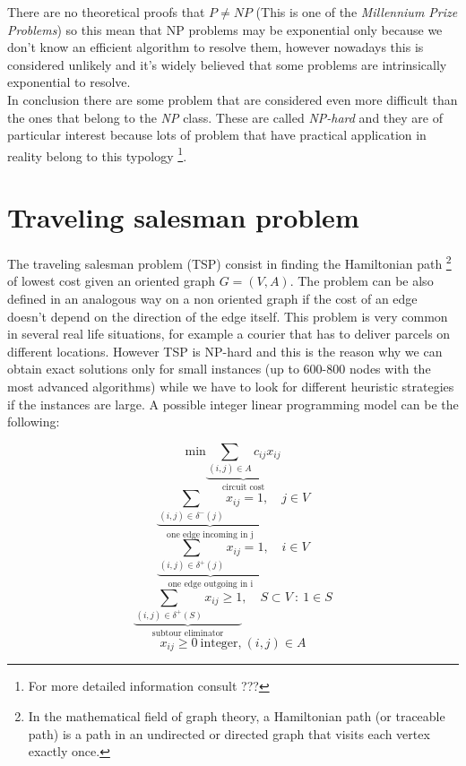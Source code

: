 There are no theoretical proofs that $P \neq NP$ (This is one of the \textit{Millennium Prize Problems}) so this mean that NP problems may be exponential only because we don't know an efficient algorithm to resolve them, however nowadays this is considered unlikely and it's widely believed that some problems are intrinsically exponential to resolve.\\
In conclusion there are some problem that are considered even more difficult than the ones that belong to the \textit{NP} class. These are called \textit{NP-hard} and they are of particular interest because lots of problem that have practical application in reality belong to this typology \footnote{For more detailed information consult ??? %
}. 

\section{Traveling salesman problem}
The traveling salesman problem (TSP) consist in finding the Hamiltonian path \footnote{In the mathematical field of graph theory, a Hamiltonian path (or traceable path) is a path in an undirected or directed graph that visits each vertex exactly once.} of lowest cost given an oriented graph $G=(V, A)$. The problem can be also defined in an analogous way on a non oriented graph if the cost of an edge doesn't depend  on the direction of the edge itself. This problem is very common in several real life situations, for example a courier that has to deliver parcels on different locations. However TSP is NP-hard and this is the reason why we can obtain exact solutions only for small instances (up to 600-800 nodes with the most advanced algorithms) while we have to look for different heuristic strategies if the instances are large.
A possible integer linear programming model can be the following:

\begin{equation}
	\text{min} \underbrace{\sum_{(i,j) \in A} c_{ij}x_{ij}}_\text{circuit cost}
\end{equation}
\begin{equation}
	\underbrace{\sum_{(i,j) \in \delta^{-}(j)} x_{ij} = 1}_\text{one edge incoming in j}, \quad j \in V 
\end{equation}
\begin{equation}
	\underbrace{\sum_{(i,j) \in \delta^{+}(j)} x_{ij} = 1}_\text{one edge outgoing in i}, \quad i \in V
\end{equation}
\begin{equation}
	\underbrace{\sum_{(i,j) \in \delta^{+}(S)} x_{ij} \geq 1}_\text{subtour eliminator}, \quad S \subset V \ : \ 1 \in S
\end{equation}
\begin{equation}
	x_{ij} \geq 0 \ \text{integer,} \ (i,j) \in A 
\end{equation}

